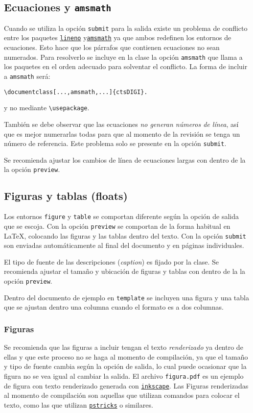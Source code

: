 \documentclass{article}
\begin{document}
\subsection{Ecuaciones y \texttt{amsmath}}
Cuando se utiliza la opción \texttt{submit} para la salida existe un problema de conflicto entre los paquetes \href{https://www.ctan.org/pkg/lineno}{\texttt{lineno}} y\href{https://www.ctan.org/pkg/amsmath}{\texttt{amsmath}} ya que ambos redefinen los entornos de ecuaciones. Esto hace que los párrafos que contienen ecuaciones no sean numerados. Para resolverlo se incluye en la clase la opción \texttt{amsmath} que llama a los paquetes en el orden adecuado para solventar el conflicto. La forma de incluir a \texttt{amsmath} será:
\begin{verbatim}
\documentclass[...,amsmath,...]{ctsDIGI}.
\end{verbatim}
y no mediante \texttt{\textbackslash usepackage}.

También se debe observar que las ecuaciones \emph{no generan números de línea}, así que es mejor numerarlas todas para que al momento de la revisión se tenga un número de referencia. Este problema solo se presente en la opción \texttt{submit}.

Se recomienda ajustar los cambios de línea de ecuaciones largas con dentro de la la opción \texttt{preview}.

\subsection{Figuras y tablas (floats)}
Los entornos \texttt{figure} y \texttt{table} se comportan diferente según la opción de salida que se escoja. Con la opción \texttt{preview} se comportan de la forma habitual en \LaTeX, colocando las figuras y las tablas dentro del texto. Con la opción \texttt{submit} son enviadas automáticamente al final del documento y en páginas individuales.

El tipo de fuente de las descripciones (\emph{caption}) es fijado por la clase. Se recomienda ajustar el tamaño y ubicación de figuras y tablas con dentro de la la opción \texttt{preview}.

Dentro del documento de ejemplo en \texttt{template} se incluyen una figura y una tabla que se ajustan dentro una columna cuando el formato es a dos columnas. 

\subsubsection{Figuras}
Se recomienda que las figuras a incluir tengan el texto \emph{renderizado} ya dentro de ellas y que este proceso no se haga al momento de compilación, ya que el tamaño y tipo de fuente cambia según la opción de salida, lo cual puede ocasionar que la figura no se vea igual al cambiar la salida. El archivo \texttt{figura.pdf} es un ejemplo de figura con texto renderizado generada con \href{https://inkscape.org}{\texttt{inkscape}}. Las Figuras renderizadas al momento de compilación son aquellas que utilizan comandos para colocar el texto, como las que utilizan \href{http://tug.org/PSTricks/main.cgi/}{\texttt{pstricks}} o similares.
\end{document}
